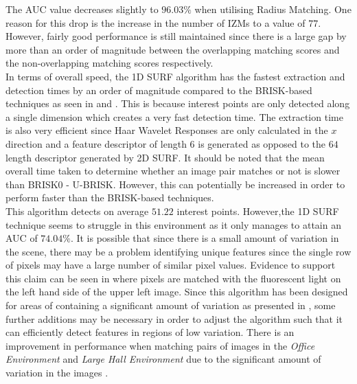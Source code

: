 \documentclass{report}
\begin{document}
The AUC value decreases slightly to $96.03\%$ when utilising Radius Matching. One reason for this drop is the increase in the number of IZMs to a value of $77$. However, fairly good performance is still maintained since there is a large gap by more than an order of magnitude between the overlapping matching scores and the non-overlapping matching scores respectively. \\



In terms of overall speed, the 1D SURF algorithm has the fastest extraction and detection times by an order of magnitude compared to the BRISK-based techniques as seen in  and . This is because interest points are only detected along a single dimension which creates a very fast detection time. The extraction time is also very efficient since Haar Wavelet Responses are only calculated in the $x$ direction and a feature descriptor of length $6$ is generated as opposed to the $64$ length descriptor generated by 2D SURF. It should be noted that the mean overall time taken to determine whether an image pair matches or not is slower than BRISK0 - U-BRISK. However, this can potentially be increased in order to perform faster than the BRISK-based techniques.\\

This algorithm detects on average $51.22$ interest points. However,the 1D SURF technique seems to struggle in this environment as it only manages to attain an AUC of $74.04\%$. It is possible that since there is a small amount of variation in the scene, there may be a problem identifying unique features since the single row of pixels may have a large number of similar pixel values. Evidence to support this claim can be seen in  where pixels are matched with the fluorescent light on the left hand side of the upper left image. Since this algorithm has been designed for areas of containing a significant amount of variation as presented in \cite{Anderson}, some further additions may be necessary in order to adjust the algorithm such that it can efficiently detect features in regions of low variation. There is an improvement in performance when matching pairs of images in the \textit{Office Environment} and \textit{Large Hall Environment} due to the significant amount of variation in the images .\\
\end{document}
